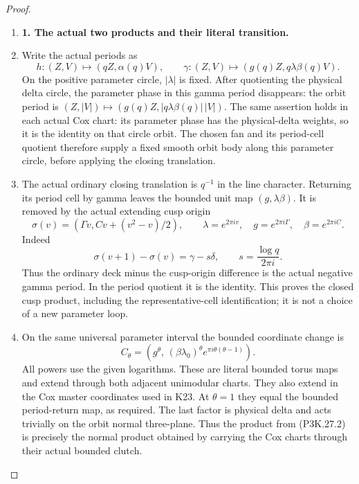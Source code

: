 \begin{proof}
\begin{enumerate}[label=\arabic*.]
\item \par\medskip\noindent\textbf{1. The actual two products and their literal transition.}\enspace

\item Write the actual periods as
\[
 h:(Z,V)\mapsto(qZ,\alpha(q)V),\qquad
 \gamma:(Z,V)\mapsto(g(q)Z,q\lambda\beta(q)V).
\]
On the positive parameter circle, \(|\lambda|\) is fixed.
After quotienting the physical delta circle, the parameter
phase in this gamma period disappears: the orbit period is
\((Z,|V|)\mapsto(g(q)Z,|q\lambda\beta(q)|\,|V|)\).
The same assertion holds in each actual Cox chart: its
parameter phase has the physical-delta weights, so it is the
identity on that circle orbit. The chosen fan and its
period-cell quotient therefore supply a fixed smooth orbit
body along this parameter circle, before applying the
closing translation.

\item The actual ordinary closing translation is \(q^{-1}\) in the
line character. Returning its period cell by gamma leaves
the bounded unit map \((g,\lambda\beta)\). It is removed by
the actual extending cusp origin
\[
 \sigma(v)=(\Gamma v,Cv+(v^2-v)/2),\qquad
 \lambda=e^{2\pi iv},\quad
 g=e^{2\pi i\Gamma},\quad\beta=e^{2\pi iC}.
                                                        \tag{P3K.27.2}
\]
Indeed
\[
 \sigma(v+1)-\sigma(v)=\gamma-s\delta,\qquad
             s=\frac{\log q}{2\pi i}.
\]
Thus the ordinary deck minus the cusp-origin difference is
the actual negative gamma period. In the period quotient
it is the identity. This proves the closed cusp product,
including the representative-cell identification; it is
not a choice of a new parameter loop.

\item On the same universal parameter interval the bounded
coordinate change is
\[
 C_\theta=
 \left(g^\theta,\,
       (\beta\lambda_0)^\theta
                       e^{\pi i\theta(\theta-1)}\right).
                                                        \tag{P3K.27.3}
\]
All powers use the given logarithms. These are literal
bounded torus maps and extend through both adjacent
unimodular charts. They also extend in the Cox master
coordinates used in K23. At \(\theta=1\) they equal the
bounded period-return map, as required. The last factor
is physical delta and acts trivially on the orbit normal
three-plane. Thus the product from (P3K.27.2) is precisely
the normal product obtained by carrying the Cox charts
through their actual bounded clutch.


\end{enumerate}
\end{proof}
